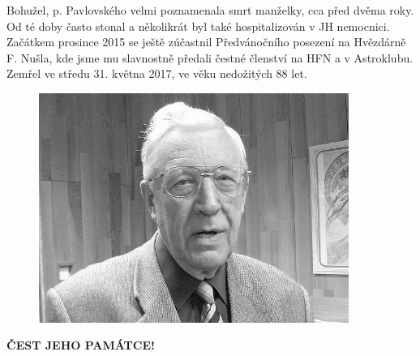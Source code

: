 \documentclass[10pt,a5paper,twoside]{book}
\begin{document}
Bohužel, p. Pavlovského velmi poznamenala smrt manželky, cca před dvěma roky. Od té doby často stonal a několikrát byl také hospitalizován v JH nemocnici. Začátkem prosince 2015 se ještě zúčastnil Předvánočního posezení na Hvězdárně F. Nušla, kde jsme mu slavnostně předali čestné členství na HFN a v Astroklubu. Zemřel ve středu 31. května 2017, ve věku nedožitých 88 let.
\begin{figure}[ht!]
\centering
\includegraphics[width=0.9\textwidth]{media/pavel-pavlovsky.jpg}
\end{figure}
\begin{center}
\textbf{ČEST JEHO PAMÁTCE!}
\end{center}
\end{document}
